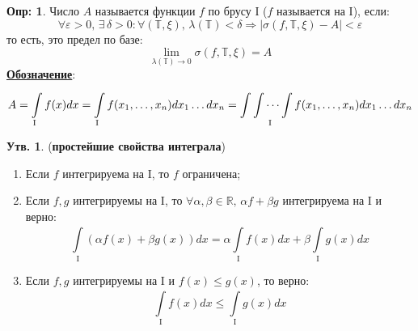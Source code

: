 \documentclass[12pt]{article}
\newcommand{\MR}{\mathbb{R}}
\newcommand{\MTB}{\mathbb{T}}
\newcommand{\MI}{\mathrm{I}}
\newcommand{\VE}{\varepsilon}
\theoremstyle{definition}
\newtheorem{defn}{Опр:}
\newtheorem{prop}{Утв.}
\newcommand{\ddint}[2]{\displaystyle\int\limits_{#1}^{#2}}
\begin{document}
\begin{defn}
	Число $A$ называется  функции $f$ по брусу $\MI$ ($f$ называется  на $\MI$), если:
	$$
		\forall \VE > 0, \, \exists \, \delta > 0 \colon \forall (\MTB,\xi), \, \lambda(\MTB) < \delta \Rightarrow |\sigma(f,\MTB,\xi) - A| < \VE
	$$
	то есть, это предел по базе:
	$$
		\lim\limits_{\lambda(\MTB) \to 0} \sigma(f,\MTB,\xi) = A
	$$
	\textbf{\uline{Обозначение}}:
	$$
		A = \ddint{\MI}{}f(x)dx = \ddint{\MI}{}f(x_1,\dotsc, x_n)dx_1\dotsc dx_n =  \int\idotsint\limits_{\MI} f(x_1,\dotsc, x_n)dx_1\dotsc dx_n 
	$$
\end{defn}
\begin{prop}(\textbf{простейшие свойства интеграла})
	\begin{enumerate}[label=\arabic*)]
		\item Если $f$ интегрируема на $\MI$, то $f$ ограничена;
		\item Если $f,g$ интегрируемы на $\MI$, то $\forall \alpha,\beta \in \MR,\, \alpha f+ \beta g$ интегрируема на $\MI$ и верно:
		$$
			\ddint{\MI}{}(\alpha f(x) + \beta g(x))dx = \alpha \ddint{\MI}{}f(x)dx + \beta \ddint{\MI}{}g(x)dx
		$$
		\item Если $f,g$ интегрируемы на $\MI$ и $f(x) \leq g(x)$, то верно:
		$$
			\ddint{\MI}{}f(x)dx \leq \ddint{\MI}{}g(x)dx
		$$
	\end{enumerate}
\end{prop}
\end{document}
